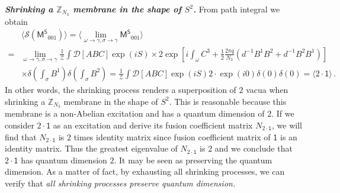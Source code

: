 \documentclass[11pt,nofootinbib,preprint]{revtex4-1}
\begin{document}
\textbf{\textit{Shrinking a $\mathbb{Z}_{N_3}$ membrane in the shape of $S^2$.}}
From path integral we obtain 
\begin{align}
&	\langle \mathcal{S} \left( \mathsf{M^S}_{001} \right) \rangle 	=\langle \underset{\omega \rightarrow \gamma, \sigma \rightarrow \gamma}{\lim}\mathsf{M^S}_{001} \rangle \nonumber
	\\
	=&\underset{\omega \rightarrow \gamma, \sigma \rightarrow \gamma}{\lim}\frac{1}{\mathcal{Z}}\int{\mathcal{D} \left[ ABC \right] \exp \left( iS \right)}
	\times 2\exp \left[ i\int_{\omega}{C^3+\frac{1}{2}\frac{2\pi q}{N_3}\left( d^{-1}B^1B^2+d^{-1}B^2B^1 \right)} \right]  \nonumber
	\\
	&\times \delta \left( \int_{\sigma}{B^1} \right) \delta \left( \int_{\sigma }{B^2} \right) =\frac{1}{\mathcal{Z}}\int{\mathcal{D} \left[ ABC\right] \exp \left( iS \right) 2\cdot\exp \left( i0 \right) \delta \left( 0 \right) \delta \left( 0 \right)}=\langle 2\cdot\mathsf{1} \rangle \,.
\end{align}
In other words, the shrinking process renders a superposition of $2$ vacua when shrinking a $\mathbb{Z}_{N_3}$ membrane in the shape of $S^2$. This is reasonable because this membrane is a non-Abelian excitation and has a quantum dimension of $2$. If we consider $2\cdot\mathsf{1}$ as an excitation and derive its fusion coefficient matrix $N_{2\cdot\mathsf{1}}$, we will find that $N_{2\cdot\mathsf{1}}$ is $2$ times identity matrix since fusion coefficient matrix of $\mathsf{1}$ is an identity matrix. Thus the greatest eigenvalue of $N_{2\cdot\mathsf{1}}$ is $2$ and we conclude that $2\cdot\mathsf{1}$ has quantum dimension $2$. It may be seen as preserving the quantum dimension. As a matter of fact, by exhausting all shrinking processes, we can verify that \textit{all shrinking processes preserve quantum dimension.}
\end{document}
